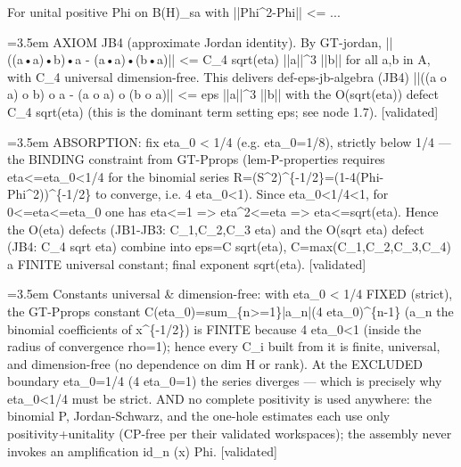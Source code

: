 \documentclass{article}
\newcommand{\step}[1]{\par\noindent\hangindent=3.5em\hangafter=1%
  \makebox[3.5em][l]{\textbf{#1.}}}
\newcommand{\steptag}[1]{\hfill{\small\textsf{[#1]}}}
\begin{document}
\begin{proofbox}{For unital positive Phi on B(H)\_sa with ||Phi\textasciicircum{}2-Phi|| <= ...}
\step{1.6} AXIOM JB4 (approximate Jordan identity). By GT-jordan, ||((a•a)•b)•a - (a•a)•(b•a)|| <= C\_4 sqrt(eta) ||a||\textasciicircum{}3 ||b|| for all a,b in A, with C\_4 universal dimension-free. This delivers def-eps-jb-algebra (JB4) ||((a o a) o b) o a - (a o a) o (b o a)|| <= eps ||a||\textasciicircum{}3 ||b|| with the O(sqrt(eta)) defect C\_4 sqrt(eta) (this is the dominant term setting eps; see node 1.7). \steptag{validated} \\[4pt]
\step{1.7} ABSORPTION: fix eta\_0 < 1/4 (e.g. eta\_0=1/8), strictly below 1/4 — the BINDING constraint from GT-Pprops (lem-P-properties requires eta<=eta\_0<1/4 for the binomial series R=(S\textasciicircum{}2)\textasciicircum{}\{-1/2\}=(1-4(Phi-Phi\textasciicircum{}2))\textasciicircum{}\{-1/2\} to converge, i.e. 4 eta\_0<1). Since eta\_0<1/4<1, for 0<=eta<=eta\_0 one has eta<=1 => eta\textasciicircum{}2<=eta => eta<=sqrt(eta). Hence the O(eta) defects (JB1-JB3: C\_1,C\_2,C\_3 eta) and the O(sqrt eta) defect (JB4: C\_4 sqrt eta) combine into eps=C sqrt(eta), C=max(C\_1,C\_2,C\_3,C\_4) a FINITE universal constant; final exponent sqrt(eta). \steptag{validated} \\[4pt]
\step{1.8} Constants universal \& dimension-free: with eta\_0 < 1/4 FIXED (strict), the GT-Pprops constant C(eta\_0)=sum\_\{n>=1\}|a\_n|(4 eta\_0)\textasciicircum{}\{n-1\} (a\_n the binomial coefficients of x\textasciicircum{}\{-1/2\}) is FINITE because 4 eta\_0<1 (inside the radius of convergence rho=1); hence every C\_i built from it is finite, universal, and dimension-free (no dependence on dim H or rank). At the EXCLUDED boundary eta\_0=1/4 (4 eta\_0=1) the series diverges — which is precisely why eta\_0<1/4 must be strict. AND no complete positivity is used anywhere: the binomial P, Jordan-Schwarz, and the one-hole estimates each use only positivity+unitality (CP-free per their validated workspaces); the assembly never invokes an amplification id\_n (x) Phi. \steptag{validated} \\[4pt]
\end{proofbox}
\end{document}
